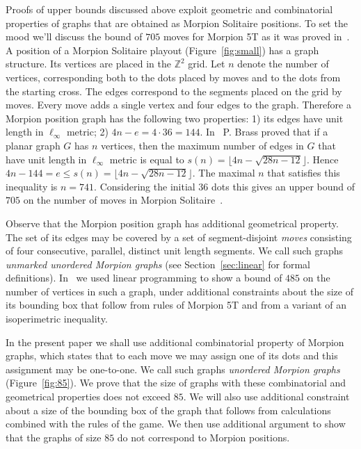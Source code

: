 \documentclass[a4paper,UKenglish]{lipics}
\begin{document}
Proofs of upper bounds discussed above exploit geometric and combinatorial properties of graphs that are obtained as Morpion Solitaire positions. 
To set the mood we'll discuss the bound of $705$ moves for Morpion 5T as it was proved in~\cite{demaine}.
A position of a Morpion Solitaire playout (Figure~\ref{fig:small}) has a graph structure.
Its vertices are placed in the $\mathbb{Z}^2$ grid.
Let $n$ denote the number of vertices, 
  corresponding both to the dots placed by moves and to the dots from the starting cross.
The edges correspond to the segments placed on the grid by moves.
Every move adds a single vertex and four edges to the graph.
Therefore a Morpion position graph has the following two properties: 1) its edges have unit length in $\ell_\infty$ metric; 2) $4n - e = 4 \cdot 36 = 144$.
In~\cite{brass} P. Brass proved that if a planar graph $G$ has $n$ vertices, 
  then the maximum number of edges in $G$ that have unit length in $\ell_\infty$ metric is equal to
  $
    s(n) = \lfloor 4n - \sqrt{28n - 12} \rfloor.
  $
Hence
$
  4n - 144 = e \leq s(n) = \lfloor 4n - \sqrt{28n - 12} \rfloor.
$
The maximal $n$ that satisfies this inequality is $n = 741$. 
Considering the initial $36$ dots this gives an upper bound of $705$ on the number of moves 
  in Morpion Solitaire~\cite{demaine}.
  
Observe that the Morpion position graph has additional geometrical property.
The set of its edges may be covered by a set of segment-disjoint \emph{moves} consisting of four consecutive, parallel, distinct unit length segments. 
We call such graphs \emph{unmarked unordered Morpion graphs} (see Section~\ref{sec:linear} for formal definitions).
In~\cite{} we used linear programming to show a bound of $485$ on the number of vertices
  in such a graph, under additional constraints about the size of its bounding box 
   that follow from rules of Morpion 5T and from a variant of an isoperimetric inequality.
  
In the present paper we shall use additional combinatorial property of Morpion graphs,
  which states that to each move we may assign one of its dots and this assignment may be one-to-one.
We call such graphs \emph{unordered Morpion graphs} (Figure~\ref{fig:85}).
We prove that the
  size of graphs with these combinatorial and geometrical properties does not exceed $85$.
We will also use additional constraint about a size of the bounding box of the graph that follows from
  calculations combined with the rules of the game.
We then use additional argument to show that the graphs of size $85$ do not correspond to Morpion positions.
\end{document}
